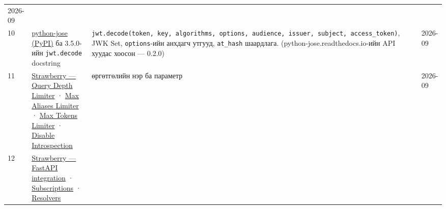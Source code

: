 \begin{longtable}[]{@{}llll@{}}
\begin{minipage}[t]{0.22\columnwidth}
2026-09\strut
\end{minipage}\tabularnewline
\begin{minipage}[t]{0.22\columnwidth}\raggedright
10\strut
\end{minipage} & \begin{minipage}[t]{0.22\columnwidth}\raggedright
\href{https://pypi.org/project/python-jose/}{python-jose (PyPI)} ба 3.5.0-ийн \texttt{jwt.decode} docstring\strut
\end{minipage} & \begin{minipage}[t]{0.22\columnwidth}\raggedright
\texttt{jwt.\allowbreak{}decode(token,\ key,\ algorithms,\ options,\ audience,\ issuer,\ subject,\ access\_\allowbreak{}token)}, JWK Set, \texttt{options}-ийн анхдагч утгууд, \texttt{at\_hash} шаардлага. (python-jose.readthedocs.io-ийн API хуудас хоосон --- 0.2.0)\strut
\end{minipage} & \begin{minipage}[t]{0.22\columnwidth}\raggedright
2026-09\strut
\end{minipage}\tabularnewline
\begin{minipage}[t]{0.22\columnwidth}\raggedright
11\strut
\end{minipage} & \begin{minipage}[t]{0.22\columnwidth}\raggedright
\href{https://strawberry.rocks/docs/extensions/query-depth-limiter}{Strawberry --- Query Depth Limiter} · \href{https://strawberry.rocks/docs/extensions/max-aliases-limiter}{Max Aliases Limiter} · \href{https://strawberry.rocks/docs/extensions/max-tokens-limiter}{Max Tokens Limiter} · \href{https://strawberry.rocks/docs/extensions/disable-introspection}{Disable Introspection}\strut
\end{minipage} & \begin{minipage}[t]{0.22\columnwidth}\raggedright
өргөтгөлийн нэр ба параметр\strut
\end{minipage} & \begin{minipage}[t]{0.22\columnwidth}\raggedright
2026-09\strut
\end{minipage}\tabularnewline
\begin{minipage}[t]{0.22\columnwidth}\raggedright
12\strut
\end{minipage} & \begin{minipage}[t]{0.22\columnwidth}\raggedright
\href{https://strawberry.rocks/docs/integrations/fastapi}{Strawberry --- FastAPI integration} · \href{https://strawberry.rocks/docs/general/subscriptions}{Subscriptions} · \href{https://strawberry.rocks/docs/types/resolvers}{Resolvers}\strut

\end{minipage}
\end{longtable}

